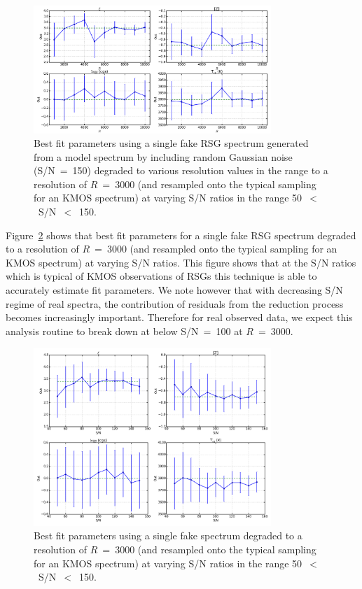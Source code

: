 \begin{figure}
 \centering
 \includegraphics[width=0.80\textwidth]{JAnal/Fakespec-tres-v1}
 \caption[Analysis test resolution]{
Best fit parameters using a single fake RSG spectrum generated from a model spectrum by including random Gaussian noise (S/N~=~150) degraded to various resolution values in the range  to a resolution of $R$~=~3000 (and resampled onto the typical sampling for an KMOS spectrum) at varying S/N ratios in the range 50~$<$~S/N~$<$~150.
\label{fig:tres}
         }
\end{figure}

Figure~\ref{fig:snr} shows that best fit parameters for a single fake RSG spectrum degraded to a resolution of $R$~=~3000 (and resampled onto the typical sampling for an KMOS spectrum) at varying S/N ratios.
This figure shows that at the S/N ratios which is typical of KMOS observations of RSGs this technique is able to accurately estimate fit parameters.
We note however that with decreasing S/N regime of real spectra, the contribution of residuals from the reduction process becomes increasingly important.
Therefore for real observed data, we expect this analysis routine to break down at below S/N~=~100 at $R$~=~3000.

\begin{figure}
 \centering
 \includegraphics[width=0.80\textwidth]{JAnal/Fakespec-tsnr-v1}
 \caption[Analysis test S/N]{
Best fit parameters using a single fake spectrum degraded to a resolution of $R$~=~3000 (and resampled onto the typical sampling for an KMOS spectrum) at varying S/N ratios in the range 50~$<$~S/N~$<$~150.
\label{fig:snr}
         }
\end{figure}


